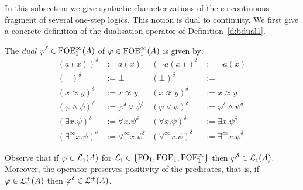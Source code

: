 In this subsection we
give syntactic characterizations of the co-continuous  fragment of several one-step logics. This notion is dual to continuity.
%
%
We first give a concrete definition of the dualisation operator of Definition~\ref{d:bdual1}.%

\begin{definition}\label{def:concreteduals} 
The \emph{dual} $\varphi^{\delta} \in {\ensuremath{\mathrm{FOE}^{\infty}_1}}(A)$ of $\varphi\in {\ensuremath{\mathrm{FOE}^{\infty}_1}}(A)$ is given by:
\begin{align*}
 (a(x))^{\delta} & :=  a(x) 
 & (\lnot a(x))^{\delta} & :=  \lnot a(x) 
\\ (\top)^{\delta} & :=  \bot 
  & (\bot)^{\delta} & :=  \top 
\\  (x \approx y)^{\delta} & :=  x \not\approx y 
  & (x \not\approx y)^{\delta}& :=  x \approx y 
\\ (\varphi \wedge \psi)^{\delta} &:=  \varphi^{\delta} \vee \psi^{\delta} 
  &(\varphi \vee \psi)^{\delta}& :=  \varphi^{\delta} \wedge \psi^{\delta}
\\ (\exists x.\psi)^{\delta} &:=  \forall x.\psi^{\delta} 
  &(\forall x.\psi)^{\delta} &:=  \exists x.\psi^{\delta} 
\\ (\exists^{\infty} x.\psi)^{\delta} &:= \forall^{\infty} x.\psi^{\delta} 
  &(\forall^{\infty} x.\psi)^{\delta} &:=  \exists^{\infty} x.\psi^{\delta}
\end{align*}
\end{definition}

\begin{remark}
	Observe that if $\varphi \in \mathcal{L}_{\scriptscriptstyle 1}(A)$ for $\mathcal{L}_{\scriptscriptstyle 1}\in\{\mathrm{FO}_1,\mathrm{FOE}_1,\mathrm{FOE}^{\infty}_1\}$ then $\varphi^{\delta} \in \mathcal{L}_{\scriptscriptstyle 1}(A)$. Moreover, the operator preserves positivity of the predicates, that is, if $\varphi \in \mathcal{L}_{\scriptscriptstyle 1}^+(A)$ then $\varphi^{\delta} \in \mathcal{L}_{\scriptscriptstyle 1}^+(A)$.
\end{remark}

